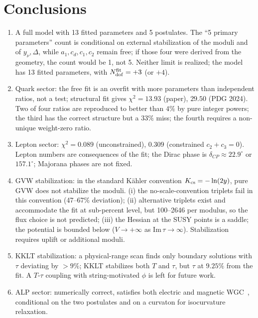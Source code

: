 \documentclass[12pt,a4paper]{article}
\numberwithin{equation}{section}
\begin{document}
\section{Conclusions}
\label{sec:conclusions}
\begin{enumerate}[leftmargin=1.5em]
\item A full model with 13 fitted parameters and 5 postulates. The
``5 primary parameters'' count is conditional on external
stabilization of the moduli and of \(y_\nu, \Delta\), while
\(a_1, c_d, c_1, c_2\) remain free; if those four were derived from
the geometry, the count would be 1, not 5. Neither limit is realized;
the model has 13 fitted parameters, with \(N_{\rm dof}^{\rm fit} = +3\)
(or \(+4\)).

\item Quark sector: the free fit is an overfit with more
parameters than independent ratios, not a test; structural fit gives
\(\chi^2 = 13.93\) (paper), \(29.50\) (PDG 2024). Two of four
ratios are reproduced to better than \(4\%\) by pure integer powers;
the third has the correct structure but a \(33\%\) miss; the fourth
requires a non-unique weight-zero ratio.

\item Lepton sector: \(\chi^2=0.089\) (unconstrained), \(0.309\)
(constrained \(c_2+c_3=0\)). Lepton numbers are consequences of the
fit; the Dirac phase is \(\delta_{CP}\approx22.9^\circ\) or
\(157.1^\circ\); Majorana phases are not fixed.

\item GVW stabilization: in the standard K\"ahler convention
\(K_{\rm cs}=-\ln(2y)\), pure GVW does not stabilize the moduli.
(i) the no-scale-convention triplets fail in this convention
(47--67\% deviation); (ii) alternative triplets exist and
accommodate the fit at sub-percent level, but 100--2646 per modulus,
so the flux choice is not predicted; (iii) the Hessian at the SUSY
points is a saddle; the potential is bounded below (\(V\to+\infty\) as
\(\mathrm{Im}\,\tau\to\infty\)). Stabilization requires uplift or
additional moduli.

\item KKLT stabilization: a physical-range scan finds only boundary
solutions with \(\tau\) deviating by \(>9\%\); KKLT stabilizes both
\(T\) and \(\tau\), but \(\tau\) at \(9.25\%\) from the fit. A
\(T\)-\(\tau\) coupling with string-motivated \(\phi\) is left for
future work.

\item ALP sector: numerically correct, satisfies both electric and
magnetic WGC~\cite{ArkaniHamed2006,Palti2019}, conditional on the two
postulates and on a curvaton for isocurvature relaxation.


\end{enumerate}
\end{document}
